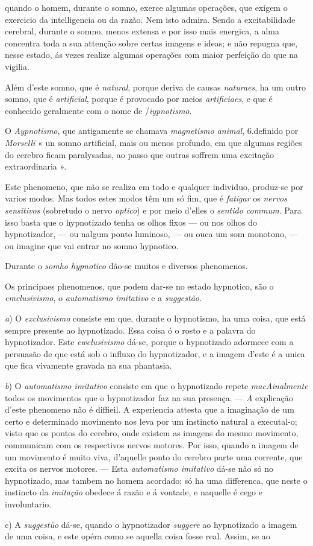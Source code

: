 quando o homem, durante o somno, exerce algumas operações, que exigem o exercicio da intelligencia ou da razão. Nem isto admira. Sendo a excitabilidade cerebral, durante o somno, menos extensa e por isso mais energica, a alma concentra toda a sua attenção sobre certas imagens e ideas; e não repugna que, nesse estado, ás vezes realize algumas operações com maior perfeição do que na vigilia.\par Além d'este somno, que é \emph{natural}, porque deriva de causas \emph{naturaes}, ha um outro somno, que é \emph{artificial}, porque é provocado por meios \emph{artificiaes}, e que é conhecido geralmente com o nome de /\emph{iypnotismo}.\par O \emph{Aypnotismo}, que antigamente se chamava \emph{magnetismo animal}, 6.definido por \emph{Morselli} « un somno artificial, mais ou menos profundo, em que algumas regiões do cerebro ficam paralysadas, ao passo que outras soffrem uma excitação extraordinaria ».\par Este phenomeno, que não se realiza em todo e qualquer individuo, produz-se por varios modos. Mas todos estes modos têm um só fim, que é \emph{fatigar} os \emph{nervos sensitivos} (sobretudo o nervo \emph{optico}) e por meio d'elles o \emph{sentido commum}. Para isso basta que o hypnotizado tenha os olhos fixos --- ou nos olhos do hypnotizador, --- ou nalgum ponto luminoso, --- ou ouca um som monotono, --- ou imagine que vai entrar no somno hypnotieo.\par Durante o \emph{somho hypnotico} dão-se muitos e diversos phenomenos.\par Os principaes phenomenos, que podem dar-se no estado hypnotico, são o \emph{emclusivismo}, o \emph{automatismo imitativo} e a \emph{suggestão}.\par \emph{a}) O \emph{exclusivismo} consiste em que, durante o hypnotismo, ha uma coisa, que está sempre presente ao hypnotizado. Essa coisa ó o rosto e a palavra do hypnotizador. Este \emph{ewclusivismo} dá-se, porque o hypnotizado adormece com a persuasão de que está sob o influxo do hypnotizador, e a imagem d'este é a unica que fica vivamente gravada na sua phantasia.\par \emph{b}) O \emph{automatismo imitativo} consiste em que o hypnotizado repete \emph{macAinalmente} todos os movimentos que o hypnotizador faz na sua presença. --- \emph{A} explicação d'este phenomeno não é diffieil. A experiencia attesta que a imaginação de um certo e determinado movimento nos leva por um instincto natural a executal-o; visto que os pontos do cerebro, onde existem as imagens do mesmo movimento, communicam com os respectivos nervos motores. Por isso, quando a imagem de um movimento é muito viva, d'aquelle ponto do cerebro parte uma corrente, que excita os nervos motores. --- Esta \emph{automatismo imitativo} dá-se não só no hypnotizado, mas tambem no homem acordado; só ha uma differenca, que neste o instincto da \emph{imitação} obedece á razão e á vontade, e naquelle é cego e involuntario.\par c) A \emph{suggestüo} dá-se, quando o hypnotizador \emph{suggere} ao hypnotizado a imagem de uma coisa, e este opéra como se aquella coisa fosse real. Assim, se ao 